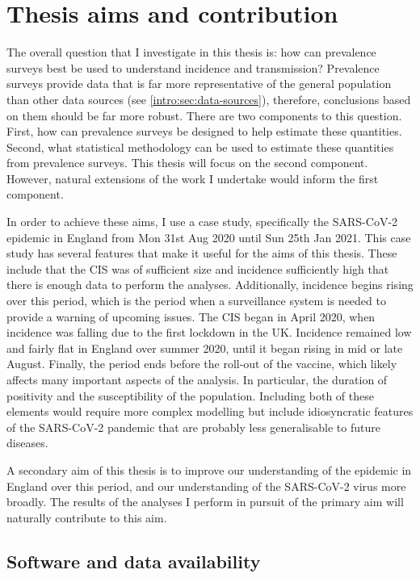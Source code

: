 \documentclass[thesis.tex]{subfiles}
\begin{document}
\section{Thesis aims and contribution} \label{intro:sec:aims}

The overall question that I investigate in this thesis is: how can prevalence surveys best be used to understand incidence and transmission?
Prevalence surveys provide data that is far more representative of the general population than other data sources (see \cref{intro:sec:data-sources}), therefore, conclusions based on them should be far more robust.
There are two components to this question.
First, how can prevalence surveys be designed to help estimate these quantities.
Second, what statistical methodology can be used to estimate these quantities from prevalence surveys.
This thesis will focus on the second component.
However, natural extensions of the work I undertake would inform the first component.

In order to achieve these aims, I use a case study, specifically the SARS-CoV-2 epidemic in England from Mon 31st Aug 2020 until Sun 25th Jan 2021.
This case study has several features that make it useful for the aims of this thesis.
These include that the CIS was of sufficient size and incidence sufficiently high that there is enough data to perform the analyses.
Additionally, incidence begins rising over this period, which is the period when a surveillance system is needed to provide a warning of upcoming issues.
The CIS began in April 2020, when incidence was falling due to the first lockdown in the UK.
Incidence remained low and fairly flat in England over summer 2020, until it began rising in mid or late August.
Finally, the period ends before the roll-out of the vaccine, which likely affects many important aspects of the analysis.
In particular, the duration of positivity and the susceptibility of the population.
Including both of these elements would require more complex modelling but include idiosyncratic features of the SARS-CoV-2 pandemic that are probably less generalisable to future diseases.

A secondary aim of this thesis is to improve our understanding of the epidemic in England over this period, and our understanding of the SARS-CoV-2 virus more broadly.
The results of the analyses I perform in pursuit of the primary aim will naturally contribute to this aim.

\subsection{Software and data availability}
\end{document}
